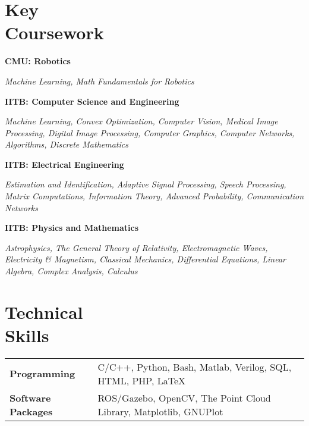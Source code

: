\documentclass[margin,line]{res}
\newenvironment{list1}{
  \begin{list}{\ding{113}}{%
      \setlength{\itemsep}{0in}
      \setlength{\parsep}{0in} \setlength{\parskip}{0in}
      \setlength{\topsep}{0in} \setlength{\partopsep}{0in} 
      \setlength{\leftmargin}{0.17in}}}{\end{list}}
\begin{document}
\begin{resume}
\section{\sc Key \\Coursework} 
\begin{list1}
\item[\strut\hspace{0.5cm}\hypertarget{crselst}{\textbf{CMU: Robotics}}]
\item[]\textit{Machine Learning, Math Fundamentals for Robotics}
\item[\strut\hspace{0.5cm}\hypertarget{crselst}{\textbf{IITB: Computer Science and Engineering}}]
\item[]\textit{Machine Learning, Convex Optimization, Computer Vision, Medical Image Processing, Digital Image Processing, Computer Graphics, Computer Networks, Algorithms, Discrete Mathematics}
\item[\strut\hspace{0.5cm}\textbf{IITB: Electrical Engineering}]
\vspace{0.05in}
\item[]\textit{Estimation and Identification, Adaptive Signal Processing, Speech Processing, Matrix Computations, Information Theory, Advanced Probability, Communication Networks}
\item[\strut\hspace{0.5cm}\textbf{IITB: Physics and Mathematics}]
\vspace{0.05in}
\item[]\textit{Astrophysics, The General Theory of Relativity, Electromagnetic Waves, Electricity \& Magnetism, Classical Mechanics, Differential Equations, Linear Algebra, Complex Analysis, Calculus}
\end{list1}

\section{\sc Technical \\Skills} 
\begin{tabular}{@{}p{1.3in}p{4.3in}}
\textbf{Programming} & C/C++, Python, Bash, Matlab, Verilog, SQL, HTML, PHP, \LaTeX \\  
\vspace*{-0.06in}
\textbf{Software Packages} & 
\vspace*{-0.06in}
ROS/Gazebo, OpenCV, The Point Cloud Library, Matplotlib, GNUPlot \\ 
\end{tabular}
%

\end{resume}
\end{document}
